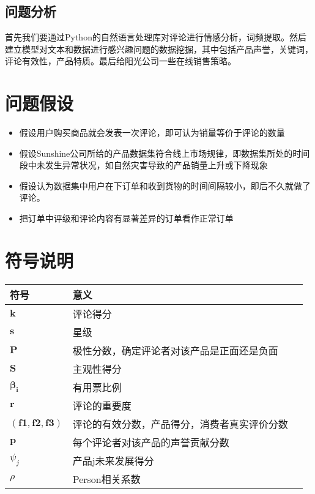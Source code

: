 \documentclass[UTF8]{article}
\begin{document}
\subsection{问题分析}
首先我们要通过Python的自然语言处理库对评论进行情感分析，词频提取。然后建立模型对文本和数据进行感兴趣问题的数据挖掘，其中包括产品声誉，关键词，评论有效性，产品特质。最后给阳光公司一些在线销售策略。

\section{问题假设}
\begin{itemize}
	\item 假设用户购买商品就会发表一次评论，即可认为销量等价于评论的数量
	\item 假设Sunshine公司所给的产品数据集符合线上市场规律，即数据集所处的时间段中未发生异常状况，如自然灾害导致的产品销量上升或下降现象
	\item 假设认为数据集中用户在下订单和收到货物的时间间隔较小，即后不久就做了评论。
	\item 把订单中评级和评论内容有显著差异的订单看作正常订单
\end{itemize}

\section*{符号说明}
\begin{table}[H]
\centering

\begin{tabular}{lll}
	\hline
	符号\quad\quad\quad\quad\quad\quad\quad\quad\quad &意义  \\
	\hline 
	$ \mathbf{k}  $   &  评论得分
	\\
	$ \mathbf{s}  $   & 星级
	\\
	$ \mathbf{P}  $   & 极性分数，确定评论者对该产品是正面还是负面
	\\
	$ \mathbf{S}  $   & 主观性得分
	\\
	$  \mathbf{\beta_i} $   & 有用票比例
	\\
	$\mathbf{r}   $   & 评论的重要度
	\\
	$ (\boldsymbol{f1},\boldsymbol{f2},\boldsymbol{f3})  $   & 评论的有效分数，产品得分，消费者真实评价分数
	\\
	$  \mathbf{p} $   &每个评论者对该产品的声誉贡献分数
	\\
	$ \psi_j $   &  产品j未来发展得分
	\\
	$  \rho $   & Person相关系数
	\\	
	\hline
\end{tabular}
\end{table}
\end{document}
